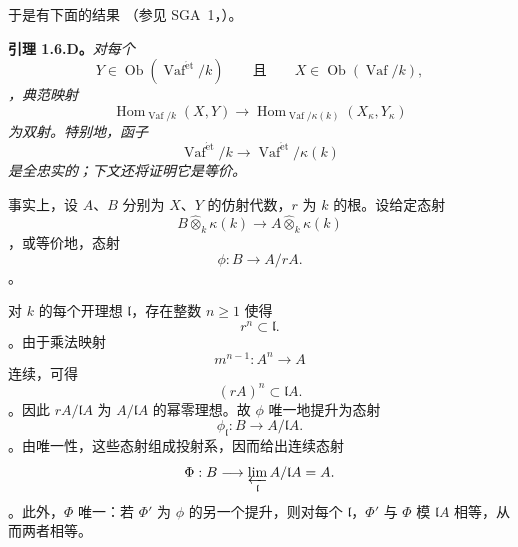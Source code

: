 于是有下面的结果 \textup{（参见 SGA~1，）}。

\medskip\noindent\textbf{引理 1.6.D。} \label{sga3:VIIB:1.6.D}\textit{对每个 \[
  Y\in\operatorname{Ob}(\operatorname{Vaf}^{\mathrm{\acute{e}t}}/k)
  \qquad\text{且}\qquad
  X\in\operatorname{Ob}(\operatorname{Vaf}/k),
\]，典范映射 \[
  \operatorname{Hom}_{\operatorname{Vaf}/k}(X,Y)
  \longrightarrow
  \operatorname{Hom}_{\operatorname{Vaf}/\kappa(k)}
    (X_\kappa,Y_\kappa)
\] 为双射。特别地，函子 \[
  \operatorname{Vaf}^{\mathrm{\acute{e}t}}/k
  \longrightarrow
  \operatorname{Vaf}^{\mathrm{\acute{e}t}}/\kappa(k)
\] 是全忠实的；下文还将证明它是等价。}

事实上，设 \(A\)、\(B\) 分别为 \(X\)、\(Y\) 的仿射代数，\(r\) 为 \(k\) 的根。设给定态射 \[
  B\widehat\otimes_k\kappa(k)
  \longrightarrow
  A\widehat\otimes_k\kappa(k)
\]，或等价地，态射 \[
  \phi:B\longrightarrow A/rA.
\]。

对 \(k\) 的每个开理想 \(\mathfrak l\)，存在整数 \(n\geq1\) 使得 \[
  r^n\subset\mathfrak l.
\]。由于乘法映射 \[
  m^{n-1}:A^n\longrightarrow A
\] 连续，可得 \[
  (rA)^n\subset\mathfrak lA.
\]。因此 \(rA/\mathfrak lA\) 为 \(A/\mathfrak lA\) 的幂零理想。故 \(\phi\) 唯一地提升为态射 \[
  \phi_{\mathfrak l}:B\longrightarrow A/\mathfrak lA.
\]。由唯一性，这些态射组成投射系，因而给出连续态射 \[
  \Phi:
  B\longrightarrow
  \varprojlim_{\mathfrak l}A/\mathfrak lA
  =
  A.
\]。此外，\(\Phi\) 唯一：若 \(\Phi'\) 为 \(\phi\) 的另一个提升，则对每个 \(\mathfrak l\)，\(\Phi'\) 与 \(\Phi\) 模 \(\mathfrak lA\) 相等，从而两者相等。
